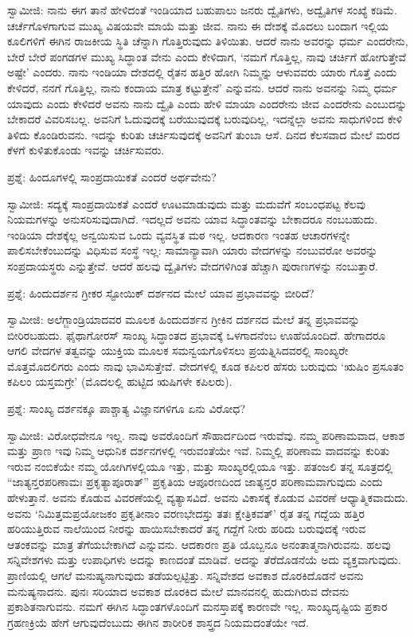 ಸ್ವಾಮೀಜಿ: ನಾನು ಈಗ ತಾನೆ ಹೇಳಿದಂತೆ ಇಂಡಿಯಾದ ಬಹುಪಾಲು ಜನರು ದ್ವೈತಿಗಳು, ಅದ್ವೈತಿಗಳ ಸಂಖ್ಯೆ ಕಡಿಮೆ. ಚರ್ಚೆಗೊಳಗಾಗುವ ಮುಖ್ಯ ವಿಷಯವೇ ಮಾಯೆ ಮತ್ತು ಜೀವ. ನಾನು ಈ ದೇಶಕ್ಕೆ ಮೊದಲು ಬಂದಾಗ ಇಲ್ಲಿಯ ಕೂಲಿಗಳಿಗೆ ಈಗಿನ ರಾಜಕೀಯ ಸ್ಥಿತಿ ಚೆನ್ನಾಗಿ ಗೊತ್ತಿರುವುದು ತಿಳಿಯಿತು. ಆದರೆ ನಾನು ಅವರನ್ನು ಧರ್ಮ ಎಂದರೇನು, ಬೇರೆ ಬೇರೆ ಪಂಗಡಗಳ ಮುಖ್ಯ ಸಿದ್ಧಾಂತ ವೇನು ಎಂದು ಕೇಳಿದಾಗ, ‘ನಮಗೆ ಗೊತ್ತಿಲ್ಲ, ನಾವು ಚರ್ಚಿಗೆ ಹೋಗುತ್ತೇವೆ ಅಷ್ಟೇ’ ಎಂದರು. ನಾನು ಇಂಡಿಯಾ ದೇಶದಲ್ಲಿ ರೈತನ ಹತ್ತಿರ ಹೋಗಿ ನಿಮ್ಮನ್ನು ಆಳುವವರು ಯಾರು ಗೊತ್ತೆ ಎಂದು ಕೇಳಿದರೆ, ನನಗೆ ಗೊತ್ತಿಲ್ಲ, ನಾನು ಕಂದಾಯ ಮಾತ್ರ ಕಟ್ಟುತ್ತೇನೆ’ ಎನ್ನುವನು. ಆದರೆ ನಾನು ಅವನನ್ನು ನಿಮ್ಮ ಧರ್ಮ ಯಾವುದು ಎಂದು ಕೇಳಿದರೆ ಅವನು ನಾನು ದ್ವೈತಿ ಎಂದು ಹೇಳಿ ಮಾಯಾ ಎಂದರೇನು ಜೀವ ಎಂದರೇನು ಎಂಬುದನ್ನು ಬೇಕಾದರೆ ವಿವರಿಸಬಲ್ಲ. ಅವನಿಗೆ ಓದುವುದಕ್ಕೆ ಬರೆಯುವುದಕ್ಕೆ ಬರುವುದಿಲ್ಲ, ಇದನ್ನೆಲ್ಲಾ ಅವನು ಸಾಧುಗಳಿಂದ ಕೇಳಿ ತಿಳಿದು ಕೊಂಡಿರುವನು. ಇದನ್ನು ಕುರಿತು ಚರ್ಚಿಸುವುದಕ್ಕೆ ಅವನಿಗೆ ತುಂಬಾ ಆಸೆ. ದಿನದ ಕೆಲಸವಾದ ಮೇಲೆ ಮರದ ಕೆಳಗೆ ಕುಳಿತುಕೊಂಡು ಇವನ್ನು ಚರ್ಚಿಸುವರು.

ಪ್ರಶ್ನೆ: ಹಿಂದೂಗಳಲ್ಲಿ ಸಾಂಪ್ರದಾಯಿಕತೆ ಎಂದರೆ ಅರ್ಥವೇನು?

ಸ್ವಾಮೀಜಿ: ಸದ್ಯಕ್ಕೆ ಸಾಂಪ್ರದಾಯಿಕತೆ ಎಂದರೆ ಊಟಮಾಡುವುದು ಮತ್ತು ಮದುವೆಗೆ ಸಂಬಂಧಪಟ್ಟ ಕೆಲವು ನಿಯಮಗಳನ್ನು ಅನುಸರಿಸುವುದಾಗಿದೆ. ಇದಲ್ಲದೆ ಅವನು ಯಾವ ಸಿದ್ಧಾಂತವನ್ನು ಬೇಕಾದರೂ ನಂಬಬಹುದು. ಇಂಡಿಯಾ ದೇಶಕ್ಕೆಲ್ಲ ಅನ್ವಯಿಸುವ ಒಂದು ವ್ಯವಸ್ಥಿತ ಮಠ ಇಲ್ಲ. ಆದಕಾರಣ ಇಂತಹ ಆಚಾರಗಳನ್ನೇ ಪಾಲಿಸಬೇಕೆಂಬುದನ್ನು ವಿಧಿಸುವ ಸಂಸ್ಥೆ ಇಲ್ಲ: ಸಾಮಾನ್ಯಾವಾಗಿ ಯಾರು ವೇದಗಳನ್ನು ನಂಬುವರೋ ಅವರನ್ನು ಸಂಪ್ರದಾಯಸ್ಥರು ಎನ್ನುತ್ತೇವೆ. ಆದರೆ ಹಲವು ದ್ವೈತಿಗಳು ವೇದಗಳಿಗಿಂತ ಹೆಚ್ಚಾಗಿ ಪುರಾಣಗಳನ್ನು ನಂಬುತ್ತಾರೆ.

ಪ್ರಶ್ನೆ: ಹಿಂದುದರ್ಶನ ಗ್ರೀಕರ ಸ್ಟೋಯಿಕ್​ ದರ್ಶನದ ಮೇಲೆ ಯಾವ ಪ್ರಭಾವವನ್ನು ಬೀರಿದೆ?

ಸ್ವಾಮೀಜಿ: ಅಲೆಗ್ಜಾಂಡ್ರಿಯಾದವರ ಮೂಲಕ ಹಿಂದುದರ್ಶನ ಗ್ರೀಕಿನ ದರ್ಶನದ ಮೇಲೆ ತನ್ನ ಪ್ರಭಾವವನ್ನು ಬೀರಿರಬಹುದು. ಫೈಥಾಗೋರಸ್​ ಸಾಂಖ್ಯ ಸಿದ್ಧಾಂತದ ಪ್ರಭಾವಕ್ಕೆ ಒಳಗಾದನೆಂಬ ಊಹೆಯೊಂದಿದೆ. ಹೇಗಾದರೂ ಆಗಲಿ ವೇದಗಳ ತತ್ವವನ್ನು ಯುಕ್ತಿಯ ಮೂಲಕ ಸಮನ್ವಯಗೊಳಿಸಲು ಪ್ರಯತ್ನಿಸಿದವರಲ್ಲಿ ಸಾಂಖ್ಯರೇ ಮೊತ್ತಮೊದಲಿಗರು ಎಂದು ನಾವು ಭಾವಿಸುತ್ತೇವೆ. ವೇದಗಳಲ್ಲಿ ಕೂಡ ಕಪಿಲರ ಹೆಸರು ಬರುವುದು ‘ಋಷಿಂ ಪ್ರಸೂತಂ ಕಪಿಲಂ ಯಸ್ತಮಗ್ರೇ’ (ಮೊದಲಲ್ಲಿ ಹುಟ್ಟಿದ ಋಷಿಗಳೇ ಕಪಿಲರು).

ಪ್ರಶ್ನೆ: ಸಾಂಖ್ಯ ದರ್ಶನಕ್ಕೂ ಪಾಶ್ಚಾತ್ಯ ವಿಜ್ಞಾನಗಳಿಗೂ ಏನು ವಿರೋಧ?

ಸ್ವಾಮೀಜಿ: ವಿರೋಧವೇನೂ ಇಲ್ಲ. ನಾವು ಅವರೊಂದಿಗೆ ಸೌಹಾರ್ದದಿಂದ ಇರುವೆವು. ನಮ್ಮ ಪರಿಣಾಮವಾದ, ಆಕಾಶ ಮತ್ತು ಪ್ರಾಣ ಇವು ನಿಮ್ಮ ಆಧುನಿಕ ದರ್ಶನಗಳಲ್ಲಿ ಇರುವಂತೆಯೇ ಇವೆ. ನಿಮ್ಮಲ್ಲಿ ಪರಿಣಾಮ ವಾದವನ್ನು ಕುರಿತು ಇರುವ ನಂಬಿಕೆಯೇ ನಮ್ಮ ಯೋಗಿಗಳಲ್ಲಿಯೂ ಇತ್ತು, ಮತ್ತು ಸಾಂಖ್ಯರಲ್ಲಿಯೂ ಇತ್ತು. ಪತಂಜಲಿ ತನ್ನ ಸೂತ್ರದಲ್ಲಿ “ಜಾತ್ಯನ್ತರಪರಿಣಾಮಃ ಪ್ರಕೃತ್ಯಾಪೂರಾತ್​” ಪ್ರಕೃತಿಯ ಆಪೂರಣದಿಂದ ಜಾತ್ಯನ್ತರ ಪರಿಣಾಮವಾಗುವುದು ಎಂದು ಹೇಳುತ್ತಾನೆ. ಅವನು ಕೊಡುವ ವಿವರಣೆಯಲ್ಲಿ ವ್ಯತ್ಯಾಸವಿದೆ. ಅವನು ವಿಕಾಸಕ್ಕೆ ಕೊಡುವ ವಿವರಣೆ ಆಧ್ಯಾತ್ಮಿಕವಾದುದು. ಅವನು ‘ನಿಮಿತ್ತಮಪ್ರಯೋಜಕಂ ಪ್ರಕೃತೀನಾಂ ವರಣಭೇದಸ್ತು ತತಃ ಕ್ಷೇತ್ರಿಕವತ್​’ ರೈತ ತನ್ನ ಗದ್ದೆಯ ಹತ್ತಿರ ಹರಿಯುತ್ತಿರುವ ನಾಲೆಯಿಂದ ನೀರನ್ನು ಹಾಯಿಸಬೇಕಾದರೆ ತನ್ನ ಗದ್ದೆಗೆ ನೀರು ಹರಿದು ಬರುವುದಕ್ಕೆ ಇರುವ ಆತಂಕವನ್ನು ಮಾತ್ರ ತೆಗೆಯಬೇಕಾಗಿದೆ ಎನ್ನುವನು. ಆದಕಾರಣ ಪ್ರತಿ ಯೊಬ್ಬನೂ ಅನಂತಾತ್ಮನಾಗಿರುವನು. ಹಲವು ಸನ್ನಿವೇಶಗಳು ಮತ್ತು ಉಪಾಧಿಗಳು ಅದನ್ನು ಕಾಣದಂತೆ ಮಾಡಿವೆ. ಅದನ್ನು ತೆರೆದೊಡನೆಯೆ ಅದು ವ್ಯಕ್ತವಾಗುವುದು. ಪ್ರಾಣಿಯಲ್ಲಿ ಆಗಲೆ ಮನುಷ್ಯನಾಗುವುದು ತಡೆಯಲ್ಪಟ್ಟಿತ್ತು. ಸನ್ನಿವೇಶದ ಅವಕಾಶ ದೊರಕಿದೊಡನೆ ಅವನು ಮನುಷ್ಯನಾದನು. ಪುನಃ ಸರಿಯಾದ ಅವಕಾಶ ದೊರಕಿದ ಮೇಲೆ ಮಾನವನಲ್ಲಿ ಹುದುಗಿರುವ ದೇವನು ಪ್ರಕಾಶಿತನಾಗುವನು. ನಮಗೆ ಈಗಿನ ಸಿದ್ಧಾಂತಗಳೊಂದಿಗೆ ಮನಸ್ತಾಪಕ್ಕೆ ಕಾರಣವೇ ಇಲ್ಲ. ಸಾಂಖ್ಯದೃಷ್ಟಿಯ ಪ್ರಕಾರ ಗ್ರಹಣಕ್ರಿಯೆ ಹೇಗೆ ಆಗುವುದೆಂಬುದು ಈಗಿನ ಶಾರೀರಿಕ ಶಾಸ್ತ್ರದ ನಿಯಮದಂತೆಯೇ ಇದೆ.

